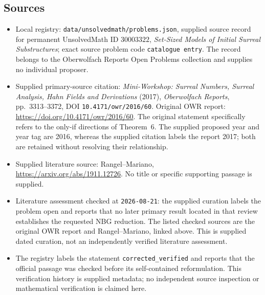 \documentclass[11pt]{article}
\begin{document}
\subsection{Sources}
\begin{itemize}
\item Local registry: \texttt{data/unsolvedmath/problems.json}, supplied source record for permanent UnsolvedMath ID \(30003322\), \emph{Set-Sized Models of Initial Surreal Substructures}; exact source problem code \texttt{catalogue entry}. The record belongs to the Oberwolfach Reports Open Problems collection and supplies no individual proposer.
\item Supplied primary-source citation: \emph{Mini-Workshop: Surreal Numbers, Surreal Analysis, Hahn Fields and Derivations} (2017), \emph{Oberwolfach Reports}, pp.~3313--3372, DOI \texttt{10.4171/owr/2016/60}. Original OWR report: \url{https://doi.org/10.4171/owr/2016/60}. The original statement specifically refers to the only-if directions of Theorem~6. The supplied proposed year and year tag are 2016, whereas the supplied citation labels the report 2017; both are retained without resolving their relationship.
\item Supplied literature source: Rangel--Mariano, \url{https://arxiv.org/abs/1911.12726}. No title or specific supporting passage is supplied.
\item Literature assessment checked at \texttt{2026-08-21}: the supplied curation labels the problem open and reports that no later primary result located in that review establishes the requested NBG reduction. The listed checked sources are the original OWR report and Rangel--Mariano, linked above. This is supplied dated curation, not an independently verified literature assessment.
\item The registry labels the statement \texttt{corrected\_verified} and reports that the official passage was checked before its self-contained reformulation. This verification history is supplied metadata; no independent source inspection or mathematical verification is claimed here.
\end{itemize}
\end{document}
